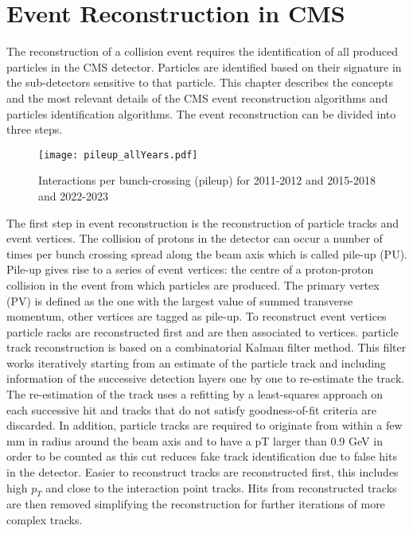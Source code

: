 \section*{Event Reconstruction in CMS}

The reconstruction of a collision event requires the identification of all produced particles in the CMS detector. Particles are identified based on their signature in the sub-detectors sensitive to that particle. This chapter describes the concepts and the most relevant details of the CMS event
reconstruction algorithms and particles identification algorithms. The event reconstruction can be divided into three steps. \\
\begin{wrapfigure}{r}{0.55\textwidth}
    \texttt{[image: pileup\_allYears.pdf]}
    \caption{Interactions per bunch-crossing (pileup) for 2011-2012 and 2015-2018 and 2022-2023}
    \label{Fig:PileUp}
\end{wrapfigure}
The first step in event reconstruction is the reconstruction of particle tracks and event vertices. The collision of protons in the detector can occur a number of times per bunch crossing spread along the beam axis which is called pile-up (PU). Pile-up gives rise to a series of event vertices: the centre of a proton-proton collision in the event from which particles are produced. The primary vertex (PV) is defined as the one with the largest value of summed transverse momentum, other vertices are tagged as pile-up. To reconstruct event vertices particle racks are reconstructed first and are then associated to vertices. particle track reconstruction is based on a combinatorial Kalman filter method\cite{BILLOIR1990219}. This filter works iteratively starting from an estimate of the 
particle track and including information of the successive detection layers one by one to re-estimate the track. The re-estimation of the track uses a refitting by a least-squares approach on each successive hit and tracks that 
do not satisfy goodness-of-fit criteria are discarded. In addition, particle tracks are required to originate from within a few mm in radius around the beam axis and to have a pT larger than 0.9 GeV in order to be counted as this cut reduces fake track identification due to false hits in the detector\cite{Sirunyan_2017}. Easier to reconstruct tracks are reconstructed first, this includes high $p_T$ and close to the interaction point tracks. Hits from reconstructed tracks are then removed simplifying the reconstruction for further iterations of more complex tracks.

